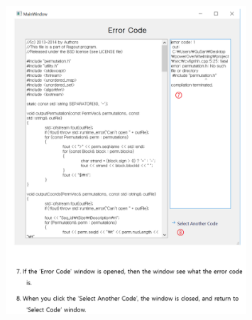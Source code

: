 \documentclass[conference]{IEEEtran}
\begin{document}
\begin{figure}[ht]
\centering
\includegraphics[width=0.8\textwidth]{./figures/7-8.png}
\caption{}
\label{user4}
\end{figure}








\end{document}
